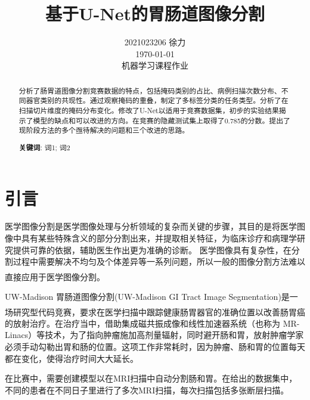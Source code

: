 \documentclass[letterpaper, 10pt, conference, twoside]{ieeeconf}
\title{\LARGE \bf
基于U-Net的胃肠道图像分割
}
\author{2021023206 \quad 徐力\\ \today\\ 机器学习课程作业}
\newcommand{\upcite}[1]{\textsuperscript{\textsuperscript{\cite{#1}}}}
\begin{document}
\maketitle



\begin{abstract}
  分析了肠胃道图像分割竞赛数据的特点，包括掩码类别的占比、病例扫描次数分布、不同器官类别的共现性。通过观察掩码的重叠，制定了多标签分类的任务类型。分析了在扫描切片维度的掩码分布变化。修改了U-Net以适用于竞赛数据集，初步的实验结果揭示了模型的缺点和可以改进的方向。在竞赛的隐藏测试集上取得了0.785的分数。提出了现阶段方法的多个亟待解决的问题和三个改进的思路。

\vspace{1ex}\noindent\textbf{关键词}: 词1; 词2

\end{abstract}


\section{引言}
医学图像分割是医学图像处理与分析领域的复杂而关键的步骤，其目的是将医学图像中具有某些特殊含义的部分分割出来，并提取相关特征，为临床诊疗和病理学研究提供可靠的依据，辅助医生作出更为准确的诊断。 医学图像具有复杂性，在分割过程中需要解决不均匀及个体差异等一系列问题，所以一般的图像分割方法难以直接应用于医学图像分割\upcite{c1}。

UW-Madison 胃肠道图像分割(UW-Madison GI Tract Image Segmentation)是一场研究型代码竞赛\upcite{c2}，要求在医学扫描中跟踪健康肠胃器官的准确位置以改善肠胃癌的放射治疗。在治疗当中，借助集成磁共振成像和线性加速器系统（也称为 MR-Linacs）等技术，为了指向肿瘤施加高剂量辐射，同时避开肠和胃，放射肿瘤学家必须手动勾勒出胃和肠的位置。这项工作非常耗时，因为肿瘤、肠和胃的位置每天都在变化，使得治疗时间大大延长。

在比赛中，需要创建模型以在MRI扫描中自动分割肠和胃。在给出的数据集中，不同的患者在不同日子里进行了多次MRI扫描，每次扫描包括多张断层扫描。
\end{document}
